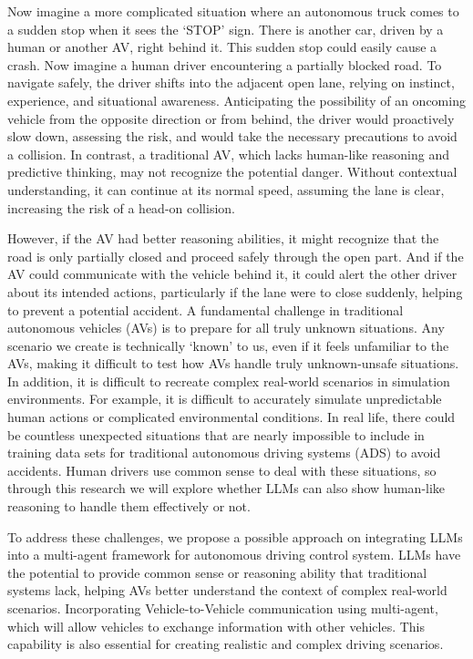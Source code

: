 \documentclass[conference]{IEEEtran}
\begin{document}
Now imagine a more complicated situation where an autonomous truck comes to a sudden stop when it sees the `STOP' sign. There is another car, driven by a human or another AV, right behind it. This sudden stop could easily cause a crash. 
Now imagine a human driver encountering a partially blocked road. To navigate safely, the driver shifts into the adjacent open lane, relying on instinct, experience, and situational awareness. Anticipating the possibility of an oncoming vehicle from the opposite direction or from behind, the driver would proactively slow down, assessing the risk, and would take the necessary precautions to avoid a collision. In contrast, a traditional AV, which lacks human-like reasoning and predictive thinking, may not recognize the potential danger. Without contextual understanding, it can continue at its normal speed, assuming the lane is clear, increasing the risk of a head-on collision.

However, if the AV had better reasoning abilities, it might recognize that the road is only partially closed and proceed safely through the open part. And if the AV could communicate with the vehicle behind it, it could alert the other driver about its intended actions, particularly if the lane were to close suddenly, helping to prevent a potential accident.
A fundamental challenge in traditional autonomous vehicles (AVs) is to prepare for all truly unknown situations\cite{singh2024systematic}. Any scenario we create is technically `known' to us, even if it feels unfamiliar to the AVs, making it difficult to test how AVs handle truly unknown-unsafe situations. In addition, it is difficult to recreate complex real-world scenarios in simulation environments. For example, it is difficult to accurately simulate unpredictable human actions or complicated environmental conditions. In real life, there could be countless unexpected situations that are nearly impossible to include in training data sets for traditional autonomous driving systems (ADS) to avoid accidents. Human drivers use common sense to deal with these situations, so through this research we will explore whether LLMs can also show human-like reasoning to handle them effectively or not. 

To address these challenges, we propose a possible approach on integrating LLMs into a multi-agent framework for autonomous driving control system. LLMs have the potential to provide common sense or reasoning ability that traditional systems lack, helping AVs better understand the context of complex real-world scenarios. Incorporating Vehicle-to-Vehicle communication using multi-agent, which will allow vehicles to exchange information with other vehicles. This capability is also essential for creating realistic and complex driving scenarios.
\end{document}
